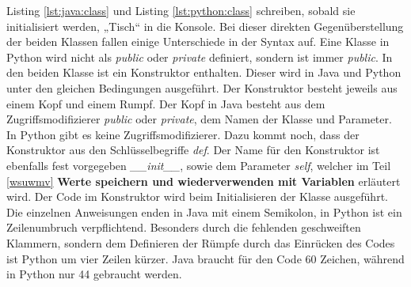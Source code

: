 Listing \ref{lst:java:class} und Listing \ref{lst:python:class} schreiben, sobald sie initialisiert werden, „Tisch“ in die Konsole. Bei dieser direkten Gegenüberstellung der beiden Klassen fallen einige Unterschiede in der Syntax auf. Eine Klasse in Python wird nicht als \textit{public} oder \textit{private} definiert, sondern ist immer \textit{public}. In den beiden Klasse ist ein Konstruktor enthalten. Dieser wird in Java und Python unter den gleichen Bedingungen ausgeführt. Der Konstruktor besteht jeweils aus einem Kopf und einem Rumpf. Der Kopf in Java besteht aus dem Zugriffsmodifizierer \textit{public} oder \textit{private}, dem Namen der Klasse und Parameter. In Python gibt es keine Zugriffsmodifizierer. Dazu kommt noch, dass der Konstruktor aus den Schlüsselbegriffe \textit{def}. Der Name für den Konstruktor ist ebenfalls fest vorgegeben \textit{\_\_init\_\_}, sowie dem Parameter \textit{self}, welcher im Teil \ref{wsuwmv} \textbf{Werte speichern und wiederverwenden mit Variablen} erläutert wird. Der Code im Konstruktor wird beim Initialisieren der Klasse ausgeführt. Die einzelnen Anweisungen enden in Java mit einem Semikolon, in Python ist ein Zeilenumbruch verpflichtend. Besonders durch die fehlenden geschweiften Klammern, sondern dem Definieren der Rümpfe durch das Einrücken des Codes ist Python um vier Zeilen kürzer. Java braucht für den Code 60 Zeichen, während in Python nur 44 gebraucht werden. 
\par

